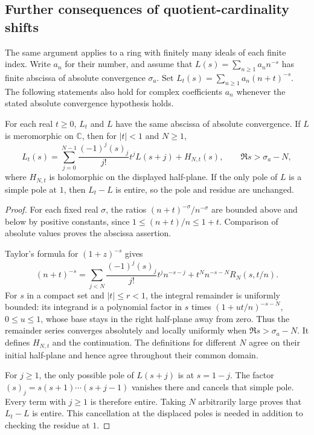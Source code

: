 \subsection{Further consequences of quotient-cardinality shifts}

The same argument applies to a ring with finitely many ideals of each
finite index. Write $a_n$ for their number, and assume that
$L(s)=\sum_{n\ge1}a_n n^{-s}$ has finite abscissa of absolute convergence
$\sigma_a$. Set $L_t(s)=\sum_{n\ge1}a_n(n+t)^{-s}$. The following statements
also hold for complex coefficients $a_n$ whenever the stated absolute
convergence hypothesis holds.

\begin{proposition}\label{prop:quotient-shift-remainder}
For each real $t\ge0$, $L_t$ and $L$ have the same abscissa of absolute
convergence. If $L$ is meromorphic on $\mathbb C$, then for $|t|<1$ and
$N\ge1$,
\[
 L_t(s)=\sum_{j=0}^{N-1}\frac{(-1)^j(s)_j}{j!}t^j L(s+j)+H_{N,t}(s),
 \qquad \Re s>\sigma_a-N,
\]
where $H_{N,t}$ is holomorphic on the displayed half-plane. If the only
pole of $L$ is a simple pole at $1$, then $L_t-L$ is entire, so the pole
and residue are unchanged.
\end{proposition}
\begin{proof}
For each fixed real $\sigma$, the ratios
$(n+t)^{-\sigma}/n^{-\sigma}$ are bounded above and below by positive
constants, since $1\le(n+t)/n\le1+t$. Comparison of absolute values proves
the abscissa assertion.

Taylor's formula for $(1+z)^{-s}$ gives
\[
 (n+t)^{-s}=\sum_{j<N}\frac{(-1)^j(s)_j}{j!}t^j n^{-s-j}
       +t^N n^{-s-N}R_N(s,t/n).
\]
For $s$ in a compact set and $|t|\le r<1$, the integral remainder is
uniformly bounded: its integrand is a polynomial factor in $s$ times
$(1+u t/n)^{-s-N}$, $0\le u\le1$, whose base stays in the right half-plane
away from zero. Thus the remainder series converges absolutely and
locally uniformly when $\Re s>\sigma_a-N$. It defines $H_{N,t}$ and the
continuation. The definitions for different $N$ agree on their initial
half-plane and hence agree throughout their common domain.

For $j\ge1$, the only possible pole of $L(s+j)$ is at $s=1-j$. The factor
$(s)_j=s(s+1)\cdots(s+j-1)$ vanishes there and cancels that simple pole.
Every term with $j\ge1$ is therefore entire. Taking $N$ arbitrarily large
proves that $L_t-L$ is entire. This cancellation at the displaced poles
is needed in addition to checking the residue at $1$.
\end{proof}

